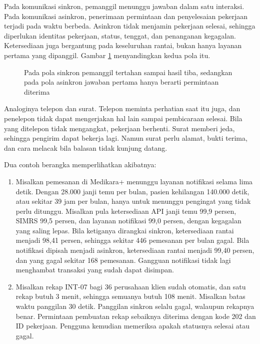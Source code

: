 Pada komunikasi sinkron, pemanggil menunggu jawaban dalam satu interaksi. Pada komunikasi asinkron, penerimaan
permintaan dan penyelesaian pekerjaan terjadi pada waktu berbeda. Asinkron tidak menjamin pekerjaan selesai, sehingga
diperlukan identitas pekerjaan, status, tenggat, dan penanganan kegagalan. Ketersediaan juga bergantung pada
keseluruhan rantai, bukan hanya layanan pertama yang dipanggil. Gambar \ref{fig:ch05-sinkron-asinkron} menyandingkan
kedua pola itu.

\begin{figure}[!htb]
  \centering
  
  \caption{Pada pola sinkron pemanggil tertahan sampai hasil tiba, sedangkan pada pola asinkron jawaban pertama hanya berarti permintaan diterima}
  \label{fig:ch05-sinkron-asinkron}
\end{figure}

Analoginya telepon dan surat. Telepon meminta perhatian saat itu juga, dan penelepon tidak dapat mengerjakan hal lain
sampai pembicaraan selesai. Bila yang ditelepon tidak mengangkat, pekerjaan berhenti. Surat memberi jeda, sehingga
pengirim dapat bekerja lagi. Namun surat perlu alamat, bukti terima, dan cara melacak bila balasan tidak kunjung
datang.

Dua contoh berangka memperlihatkan akibatnya:
\begin{enumerate}
  \item Misalkan pemesanan di Medikara+ menunggu layanan notifikasi selama lima detik. Dengan 28.000 janji temu per
        bulan, pasien kehilangan 140.000 detik, atau sekitar 39 jam per bulan, hanya untuk menunggu pengingat yang
        tidak perlu ditunggu. Misalkan pula ketersediaan API janji temu 99,9 persen, SIMRS 99,5 persen, dan layanan
        notifikasi 99,0 persen, dengan kegagalan yang saling lepas. Bila ketiganya dirangkai sinkron, ketersediaan
        rantai menjadi 98,41 persen, sehingga sekitar 446 pemesanan per bulan gagal. Bila notifikasi dipisah menjadi
        asinkron, ketersediaan rantai menjadi 99,40 persen, dan yang gagal sekitar 168 pemesanan. Gangguan notifikasi
        tidak lagi menghambat transaksi yang sudah dapat disimpan.
  \item Misalkan rekap INT-07 bagi 36 perusahaan klien sudah otomatis, dan satu rekap butuh 3 menit, sehingga semuanya
        butuh 108 menit. Misalkan batas waktu panggilan 30 detik. Panggilan sinkron selalu gagal, walaupun rekapnya
        benar. Permintaan pembuatan rekap sebaiknya diterima dengan kode 202 dan ID pekerjaan. Pengguna kemudian
        memeriksa apakah statusnya selesai atau gagal.
\end{enumerate}

